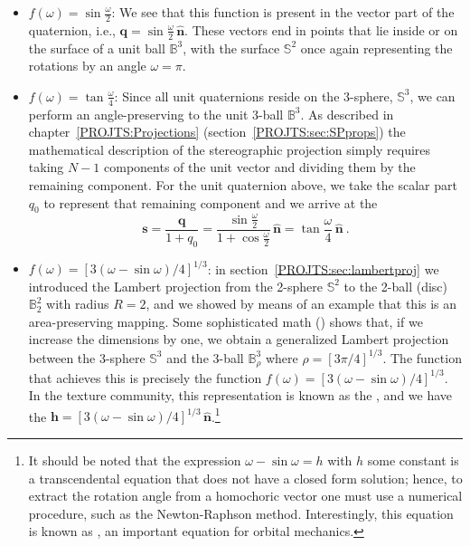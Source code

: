 \begin{itemize}
	\item \textcolor{OCSkiboRed}{$f(\omega) = \sin\frac{\omega}{2}$}: We see that this function is present in the vector part of the quaternion, i.e., $\mathbf{q}=\sin\frac{\omega}{2}\,\hat{\mathbf{n}}$.  These vectors end in points that lie inside or on the surface of a unit ball $\mathbb{B}^3$, with the surface $\mathbb{S}^2$ once again representing  the rotations by an angle $\omega=\pi$.  
	\item \textcolor{OCSkiboRed}{$f(\omega) = \tan\frac{\omega}{4}$}: Since all unit quaternions reside on the 3-sphere, $\mathbb{S}^3$, we can perform an angle-preserving  to the unit 3-ball $\mathbb{B}^3$. As described in chapter~\ref{PROJTS:Projections} (section~\ref{PROJTS:sec:SPprops}) the mathematical description of the stereographic projection simply requires taking  $N-1$ components of the unit vector and dividing them by the remaining component.  For the unit quaternion above, we take the scalar part $q_0$ to represent that remaining component and we arrive at the 
	\[
		\mathbf{s} = \frac{\mathbf{q}}{1+q_0} = \frac{\sin\frac{\omega}{2}}{1+\cos\frac{\omega}{2}}\,\hat{\mathbf{n}} = \tan\frac{\omega}{4}\,\hat{\mathbf{n}}\ .
	\]
	\item \textcolor{OCSkiboRed}{$f(\omega) = [3(\omega-\sin\omega)/4]^{1/3}$}:	in section~\ref{PROJTS:sec:lambertproj} we introduced the Lambert projection from the 2-sphere $\mathbb{S}^2$ to the 2-ball (disc) $\mathbb{B}^2_2$ with radius $R=2$, and we showed by means of an example that this is an area-preserving mapping.  Some sophisticated math (\cite{degraef2014r}) shows that, if we increase the dimensions by one, we obtain a generalized Lambert projection between the 3-sphere $\mathbb{S}^3$ and the 3-ball $\mathbb{B}^3_{\rho}$ where $\rho=[3\pi/4]^{1/3}$.  The function that achieves this  is precisely the function $f(\omega) = [3(\omega-\sin\omega)/4]^{1/3}$.  In the texture community, this representation is known as the , and we have the  $\mathbf{h}=  [3(\omega-\sin\omega)/4]^{1/3}\,\hat{\mathbf{n}}$.\footnote{It should be noted that the expression $\omega-\sin\omega=h$ with $h$ some constant is a transcendental equation that does not have a closed form solution; hence, to extract the rotation angle from a homochoric vector one must use a numerical procedure, such as the Newton-Raphson method.  Interestingly, this equation is known as , an important equation for orbital mechanics.} 
\end{itemize}
 
